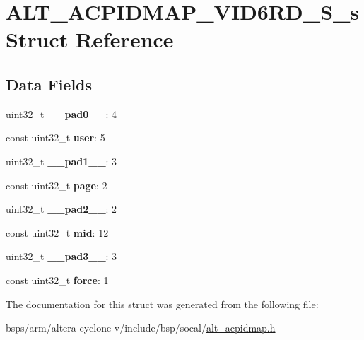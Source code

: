 \hypertarget{structALT__ACPIDMAP__VID6RD__S__s}{}\section{A\+L\+T\+\_\+\+A\+C\+P\+I\+D\+M\+A\+P\+\_\+\+V\+I\+D6\+R\+D\+\_\+\+S\+\_\+s Struct Reference}
\label{structALT__ACPIDMAP__VID6RD__S__s}
\subsection*{Data Fields}
\begin{DoxyCompactItemize}
\item 
\mbox{\label{structALT__ACPIDMAP__VID6RD__S__s_ac701ea2ac95ea824ea3520e342557f0b}} 
uint32\+\_\+t {\bfseries \+\_\+\+\_\+pad0\+\_\+\+\_\+}\+: 4
\item 
\mbox{\label{structALT__ACPIDMAP__VID6RD__S__s_a5a1aa644389adf6b800f6b2b8ec70d65}} 
const uint32\+\_\+t {\bfseries user}\+: 5
\item 
\mbox{\label{structALT__ACPIDMAP__VID6RD__S__s_a86e404e685f0eaea67beb5bfa68551a4}} 
uint32\+\_\+t {\bfseries \+\_\+\+\_\+pad1\+\_\+\+\_\+}\+: 3
\item 
\mbox{\label{structALT__ACPIDMAP__VID6RD__S__s_aad3d1a6e072ed358e281f417b2e4d62b}} 
const uint32\+\_\+t {\bfseries page}\+: 2
\item 
\mbox{\label{structALT__ACPIDMAP__VID6RD__S__s_a3d11b24487b2b4cd63a71871f6b1a902}} 
uint32\+\_\+t {\bfseries \+\_\+\+\_\+pad2\+\_\+\+\_\+}\+: 2
\item 
\mbox{\label{structALT__ACPIDMAP__VID6RD__S__s_a305ced18ef78dd87ab9cc55dc9cd1498}} 
const uint32\+\_\+t {\bfseries mid}\+: 12
\item 
\mbox{\label{structALT__ACPIDMAP__VID6RD__S__s_aa26f6e531882ad9528ed866f07fb8770}} 
uint32\+\_\+t {\bfseries \+\_\+\+\_\+pad3\+\_\+\+\_\+}\+: 3
\item 
\mbox{\label{structALT__ACPIDMAP__VID6RD__S__s_a91d35097157e2f4c1c448d97bba22dac}} 
const uint32\+\_\+t {\bfseries force}\+: 1
\end{DoxyCompactItemize}


The documentation for this struct was generated from the following file\+:\begin{DoxyCompactItemize}
\item 
bsps/arm/altera-\/cyclone-\/v/include/bsp/socal/\mbox{\hyperlink{alt__acpidmap_8h}{alt\+\_\+acpidmap.\+h}}\end{DoxyCompactItemize}

